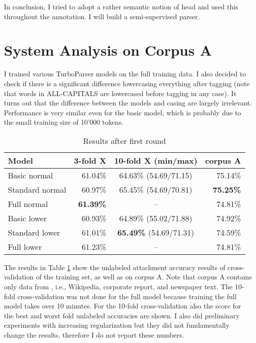 \documentclass[11pt,letterpaper, covington]{article}
\begin{document}
In conclusion, I tried to adopt a rather semantic notion of head and used this throughout the annotation. I will build a semi-supervised parser.

\section{System Analysis on Corpus A}

I trained various TurboParser models on the full training data. I also decided to check if there is a significant difference lowercasing everything  after tagging (note that words in ALL-CAPITALS are lowercased before tagging in any case). It turns out that the difference between the models and casing are largely irrelevant. Performance is very similar even for the basic model, which is probably due to the small training size of 10'000 tokens.

\begin{table}
\center
  \begin{tabular}{ | l || r | c | r | }
    \hline
   \textbf{Model} & \textbf{3-fold X} & \textbf{10-fold X (min/max)} & \textbf{corpus A}  \\ \hline
    Basic normal & 61.04\% & 64.63\% (54.69/71.15) & 75.14\% \\
    Standard normal & 60.97\% & 65.45\% (54.69/70.81) & \textbf{75.25\%} \\ 
    Full normal & \textbf{61.39\%} & -- & 74.81\% \\ \hline
    Basic lower & 60.93\% & 64.89\% (55.02/71.88) & 74.92\% \\
    Standard lower & 61.01\% & \textbf{65.49\%} (54.69/71.31) & 74.59\% \\
    Full lower & 61.23\% & -- & 74.81\%  \\ \hline
  \end{tabular}
\caption{Results after first round}
\label{tab:res1}
\end{table}

The results in Table \ref{tab:res1} show the unlabeled attachment accuracy results of cross-validation of the training set, as well as on corpus A. Note that corpus A contains only data from \cite{AH14}, i.e., Wikipedia, corporate report, and newspaper text. The 10-fold cross-validation was not done for the full model because training the full model takes over 10 minutes. For the 10-fold cross-validation also the score for the best and worst fold unlabeled accuracies are shown. I also did preliminary experiments with increasing regularization but they did not fundamentally change the results, therefore I do not report these numbers.
\end{document}
